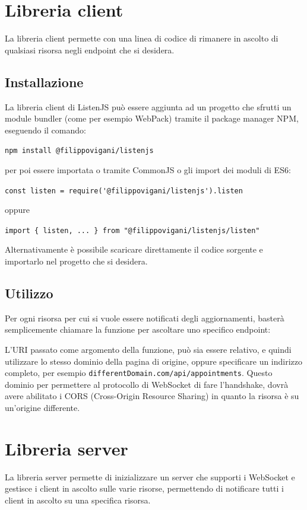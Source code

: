 \documentclass[12pt,a4paper,openright,twoside]{report}
\begin{document}
\section{Libreria client}
La libreria client permette con una linea di codice di rimanere in ascolto di qualsiasi risorsa negli endpoint che si desidera.

\subsection{Installazione}
La libreria client di ListenJS può essere aggiunta ad un progetto che sfrutti un module bundler (come per esempio WebPack) tramite il package manager NPM, eseguendo il comando:
\begin{center}
\lstinline{npm install @filippovigani/listenjs}
\end{center}
per poi essere importata o tramite CommonJS o gli import dei moduli di ES6:
\begin{center}
\lstinline{const listen = require('@filippovigani/listenjs').listen}
\end{center}
oppure
\begin{center}
\lstinline|import { listen, ... } from "@filippovigani/listenjs/listen"|
\end{center}  
Alternativamente è possibile scaricare direttamente il codice sorgente\cite{listenjs_repo} e importarlo nel progetto che si desidera.

\subsection{Utilizzo}
Per ogni risorsa per cui si vuole essere notificati degli aggiornamenti, basterà semplicemente chiamare la funzione per ascoltare uno specifico endpoint:

L'URI passato come argomento della funzione, può sia essere relativo, e quindi utilizzare lo stesso dominio della pagina di origine, oppure specificare un indirizzo completo, per esempio \lstinline{differentDomain.com/api/appointments}. Questo dominio per permettere al protocollo di WebSocket di fare l'handshake, dovrà avere abilitato i CORS (Cross-Origin Resource Sharing) in quanto la risorsa è su un'origine differente.

\section{Libreria server}
La libreria server permette di inizializzare un server che supporti i WebSocket e gestisce i client in ascolto sulle varie risorse, permettendo di notificare tutti i client in ascolto su una specifica risorsa. 
\end{document}
